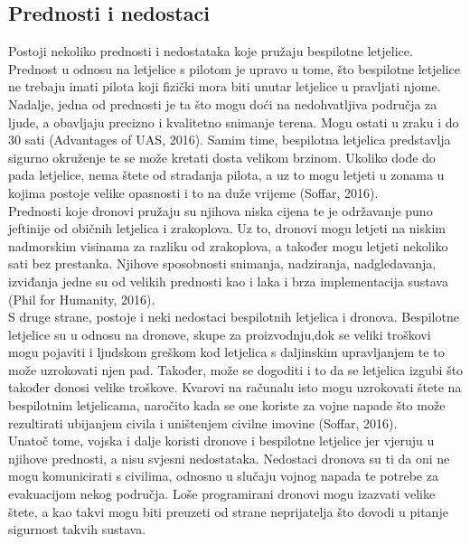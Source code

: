 \documentclass[times, utf8, diplomski]{fer}
\begin{document}
\subsection{Prednosti i nedostaci}
Postoji nekoliko prednosti i nedostataka koje pružaju bespilotne letjelice. Prednost u odnosu na letjelice s pilotom je upravo u tome, što bespilotne letjelice ne trebaju imati pilota 
koji fizički  mora  biti  unutar  letjelice  u
pravljati  njome.  Nadalje, jedna od prednosti je ta što mogu doći na nedohvatljiva područja za ljude, a obavljaju precizno i kvalitetno snimanje terena. Mogu ostati u zraku i do 30 sati (Advantages of UAS, 2016). Samim time, bespilotna letjelica predstavlja sigurno okruženje te se može kretati dosta velikom brzinom. Ukoliko dođe do pada letjelice, nema štete od stradanja pilota, a uz to mogu letjeti u zonama u kojima postoje velike opasnosti i to na duže vrijeme (Soffar, 2016). \\
Prednosti koje dronovi pružaju su njihova niska cijena te je održavanje puno jeftinije od običnih letjelica i zrakoplova. Uz to, dronovi mogu letjeti na niskim nadmorskim visinama za razliku od zrakoplova, a također mogu letjeti nekoliko sati bez prestanka. Njihove sposobnosti snimanja, nadziranja, nadgledavanja, izviđanja jedne su od velikih prednosti kao i laka i brza implementacija sustava (Phil for Humanity, 2016).\\
S  druge  strane,  postoje  i  neki  nedostaci  bespilotnih  letjelica  i  dronova. Bespilotne letjelice su u odnosu na dronove, skupe za proizvodnju,dok se veliki troškovi mogu pojaviti i ljudskom greškom kod letjelica s daljinskim upravljanjem te to može uzrokovati njen pad. Također, može se dogoditi i to da se letjelica izgubi što također donosi velike troškove. Kvarovi na računalu isto mogu uzrokovati štete na bespilotnim letjelicama, naročito kada se one koriste za vojne napade što može rezultirati ubijanjem civila i uništenjem  civilne  imovine (Soffar, 2016). \\
Unatoč tome, vojska i dalje koristi dronove i  bespilotne letjelice jer vjeruju u njihove prednosti, a nisu svjesni nedostataka. Nedostaci dronova su ti da oni ne mogu komunicirati s civilima, odnosno u slučaju vojnog napada te potrebe za evakuacijom nekog područja. Loše programirani dronovi mogu izazvati velike štete, a kao takvi mogu biti preuzeti od strane neprijatelja što dovodi u pitanje sigurnost takvih sustava. 


 
\end{document}
